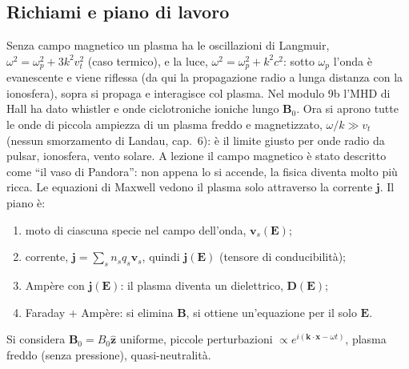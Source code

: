 \subsection{Richiami e piano di lavoro}
Senza campo magnetico un plasma ha le oscillazioni di Langmuir, $\omega^2=\omega_p^2+3k^2v_t^2$ (caso termico), e la luce, $\omega^2=\omega_p^2+k^2c^2$: sotto $\omega_p$ l'onda è evanescente e viene riflessa (da qui la propagazione radio a lunga distanza con la ionosfera), sopra si propaga e interagisce col plasma. Nel modulo 9b l'MHD di Hall ha dato whistler e onde ciclotroniche ioniche lungo $\mathbf{B}_0$. Ora si aprono tutte le onde di piccola ampiezza di un plasma freddo e magnetizzato, $\omega/k\gg v_t$ (nessun smorzamento di Landau, cap.~6): è il limite giusto per onde radio da pulsar, ionosfera, vento solare. A lezione il campo magnetico è stato descritto come ``il vaso di Pandora'': non appena lo si accende, la fisica diventa molto più ricca.
Le equazioni di Maxwell vedono il plasma solo attraverso la corrente $\mathbf{j}$. Il piano è:
\begin{enumerate}
\item moto di ciascuna specie nel campo dell'onda, $\mathbf{v}_s(\mathbf{E})$;
\item corrente, $\mathbf{j}=\sum_sn_sq_s\mathbf{v}_s$, quindi $\mathbf{j}(\mathbf{E})$ (tensore di conducibilità);
\item Amp\`ere con $\mathbf{j}(\mathbf{E})$: il plasma diventa un dielettrico, $\mathbf{D}(\mathbf{E})$;
\item Faraday + Amp\`ere: si elimina $\mathbf{B}$, si ottiene un'equazione per il solo $\mathbf{E}$.
\end{enumerate}
Si considera $\mathbf{B}_0=B_0\hat{\mathbf{z}}$ uniforme, piccole perturbazioni $\propto e^{i(\mathbf{k}\cdot\mathbf{x}-\omega t)}$, plasma freddo (senza pressione), quasi-neutralità.


